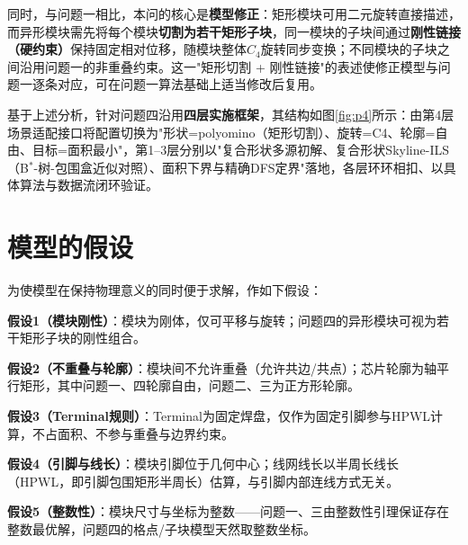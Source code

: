 \documentclass{JXUSTmodeling}
\begin{document}
同时，与问题一相比，本问的核心是\textbf{模型修正}：矩形模块可用二元旋转直接描述，而异形模块需先将每个模块\textbf{切割为若干矩形子块}，同一模块的子块间通过\textbf{刚性链接（硬约束）}保持固定相对位移，随模块整体$C_4$旋转同步变换；不同模块的子块之间沿用问题一的非重叠约束。这一"矩形切割 + 刚性链接"的表述使修正模型与问题一逐条对应，可在问题一算法基础上适当修改后复用。

基于上述分析，针对问题四沿用\textbf{四层实施框架}，其结构如图\ref{fig:p4}所示：由第4层场景适配接口将配置切换为"形状=polyomino（矩形切割）、旋转=C4、轮廓=自由、目标=面积最小"，第1--3层分别以"复合形状多源初解、复合形状Skyline-ILS（B${}^{\ast}$-树-包围盒近似对照）、面积下界与精确DFS定界"落地，各层环环相扣、以具体算法与数据流闭环验证。

\section{模型的假设}\label{sec:3}
为使模型在保持物理意义的同时便于求解，作如下假设：

\textbf{假设1（模块刚性）}：模块为刚体，仅可平移与旋转；问题四的异形模块可视为若干矩形子块的刚性组合。

\textbf{假设2（不重叠与轮廓）}：模块间不允许重叠（允许共边/共点）；芯片轮廓为轴平行矩形，其中问题一、四轮廓自由，问题二、三为正方形轮廓。

\textbf{假设3（Terminal规则）}：Terminal为固定焊盘，仅作为固定引脚参与HPWL计算，不占面积、不参与重叠与边界约束。

\textbf{假设4（引脚与线长）}：模块引脚位于几何中心；线网线长以半周长线长（HPWL，即引脚包围矩形半周长）估算，与引脚内部连线方式无关。

\textbf{假设5（整数性）}：模块尺寸与坐标为整数——问题一、三由整数性引理保证存在整数最优解，问题四的格点/子块模型天然取整数坐标。
\end{document}
